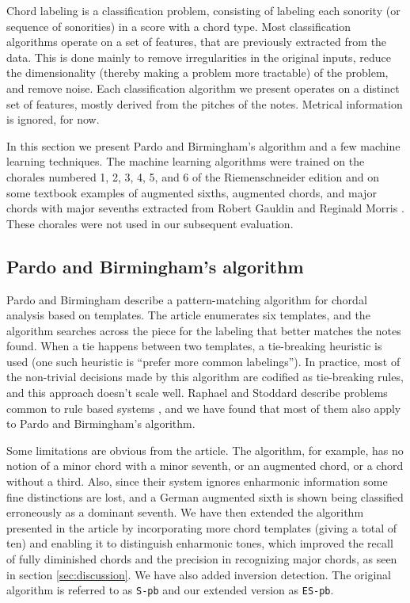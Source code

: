\documentclass{article}
\begin{document}
Chord labeling is a classification problem, consisting of labeling
each sonority (or sequence of sonorities) in a score with a chord
type. Most classification algorithms operate on a set of features,
that are previously extracted from the data. This is done mainly to
remove irregularities in the original inputs, reduce the
dimensionality (thereby making a problem more tractable) of the
problem, and remove noise. Each classification algorithm we present
operates on a distinct set of features, mostly derived from the
pitches of the notes. Metrical information is ignored, for now.

In this section we present Pardo and Birmingham's algorithm and a few
machine learning techniques. The machine learning algorithms were
trained on the chorales numbered 1, 2, 3, 4, 5, and 6 of the
Riemenschneider edition and on some textbook examples of augmented
sixths, augmented chords, and major chords with major sevenths
extracted from Robert Gauldin \cite{gauldin05:harmonic} and Reginald
Morris \cite{morris33:figured}. These chorales were not used in our
subsequent evaluation.

\subsection{Pardo and Birmingham's algorithm}
\label{sec:pardo}


Pardo and Birmingham \cite{barthelemy.ea01:figured} describe a
pattern-matching algorithm for chordal analysis based on templates.
The article enumerates six templates, and the algorithm searches
across the piece for the labeling that better matches the notes found.
When a tie happens between two templates, a tie-breaking heuristic is
used (one such heuristic is ``prefer more common labelings''). In
practice, most of the non-trivial decisions made by this algorithm are
codified as tie-breaking rules, and this approach doesn't scale
well. Raphael and Stoddard describe problems common to rule based
systems \cite{raphael.ea03:harmonic}, and we have found that most of
them also apply to Pardo and Birmingham's algorithm.

Some limitations are obvious from the article. The algorithm, for
example, has no notion of a minor chord with a minor seventh, or an
augmented chord, or a chord without a third. Also, since their system
ignores enharmonic information some fine distinctions are lost, and a
German augmented sixth is shown being classified erroneously as a
dominant seventh. We have then extended the algorithm presented in the
article by incorporating more chord templates (giving a total of ten)
and enabling it to distinguish enharmonic tones, which improved the
recall of fully diminished chords and the precision in recognizing
major chords, as seen in section \ref{sec:discussion}. We have also
added inversion detection. The original algorithm is referred to as
\texttt{S-pb} and our extended version as \texttt{ES-pb}.
\end{document}
